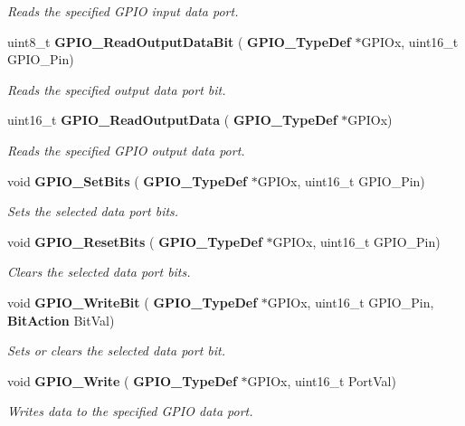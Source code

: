 \begin{DoxyCompactItemize}
\begin{DoxyCompactList}\small\item\em Reads the specified G\+P\+IO input data port. \end{DoxyCompactList}\item 
uint8\+\_\+t \textbf{ G\+P\+I\+O\+\_\+\+Read\+Output\+Data\+Bit} (\textbf{ G\+P\+I\+O\+\_\+\+Type\+Def} $\ast$G\+P\+I\+Ox, uint16\+\_\+t G\+P\+I\+O\+\_\+\+Pin)
\begin{DoxyCompactList}\small\item\em Reads the specified output data port bit. \end{DoxyCompactList}\item 
uint16\+\_\+t \textbf{ G\+P\+I\+O\+\_\+\+Read\+Output\+Data} (\textbf{ G\+P\+I\+O\+\_\+\+Type\+Def} $\ast$G\+P\+I\+Ox)
\begin{DoxyCompactList}\small\item\em Reads the specified G\+P\+IO output data port. \end{DoxyCompactList}\item 
void \textbf{ G\+P\+I\+O\+\_\+\+Set\+Bits} (\textbf{ G\+P\+I\+O\+\_\+\+Type\+Def} $\ast$G\+P\+I\+Ox, uint16\+\_\+t G\+P\+I\+O\+\_\+\+Pin)
\begin{DoxyCompactList}\small\item\em Sets the selected data port bits. \end{DoxyCompactList}\item 
void \textbf{ G\+P\+I\+O\+\_\+\+Reset\+Bits} (\textbf{ G\+P\+I\+O\+\_\+\+Type\+Def} $\ast$G\+P\+I\+Ox, uint16\+\_\+t G\+P\+I\+O\+\_\+\+Pin)
\begin{DoxyCompactList}\small\item\em Clears the selected data port bits. \end{DoxyCompactList}\item 
void \textbf{ G\+P\+I\+O\+\_\+\+Write\+Bit} (\textbf{ G\+P\+I\+O\+\_\+\+Type\+Def} $\ast$G\+P\+I\+Ox, uint16\+\_\+t G\+P\+I\+O\+\_\+\+Pin, \textbf{ Bit\+Action} Bit\+Val)
\begin{DoxyCompactList}\small\item\em Sets or clears the selected data port bit. \end{DoxyCompactList}\item 
void \textbf{ G\+P\+I\+O\+\_\+\+Write} (\textbf{ G\+P\+I\+O\+\_\+\+Type\+Def} $\ast$G\+P\+I\+Ox, uint16\+\_\+t Port\+Val)
\begin{DoxyCompactList}\small\item\em Writes data to the specified G\+P\+IO data port. \end{DoxyCompactList}\item 

\end{DoxyCompactItemize}

